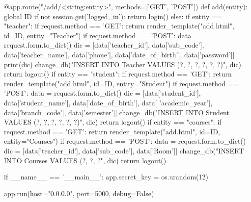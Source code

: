 \begin{python}
@app.route("/add/<string:entity>", methods=['GET', 'POST'])
def add(entity):
    global ID
    if not session.get('logged_in'):
        return login()
    else:
        if entity == "teacher":
            if request.method == 'GET':
                return render_template("add.html", id=ID, entity="Teacher")
            if request.method == 'POST':
                data = request.form.to_dict()
                dic = [data['teacher_id'], data['sub_code'],
                       data['teacher_name'],  data['phone'],
                       data['date_of_birth'],  data['password']]
                print(dic)
                change_db("INSERT INTO Teacher VALUES (?, ?, ?, ?, ?, ?)", dic)
                return logout()
        if entity == "student":
            if request.method == 'GET':
                return render_template("add.html", id=ID, entity="Student")
            if request.method == 'POST':
                data = request.form.to_dict()
                dic = [data['student_id'], data['student_name'],
                       data['date_of_birth'],  data[
                           'academic_year'],  data['branch_code'],
                       data['semester']]
                change_db("INSERT INTO Student VALUES (?, ?, ?, ?, ?, ?)", dic)
                return logout()
        if entity == "courses":
            if request.method == 'GET':
                return render_template("add.html",  id=ID,
                                       entity="Courses")
            if request.method == 'POST':
                data = request.form.to_dict()
                dic = [data['teacher_id'], data['sub_code'],
                       data['Room']]
                change_db("INSERT INTO Courses VALUES (?, ?, ?", dic)
                return logout()



if __name__ == '__main__':
    app.secret_key = os.urandom(12)

    app.run(host="0.0.0.0", port=5000, debug=False)

\end{python}

